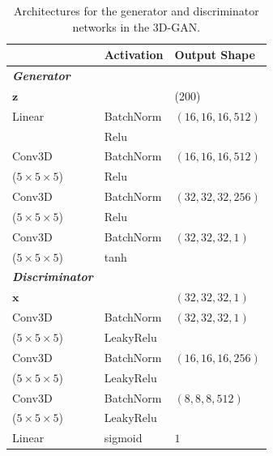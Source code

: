 \documentclass[twocolumn]{article}
\numberwithin{equation}{section}
\begin{document}
\begin{table}[h!]
\centering
\begin{tabularx}{\columnwidth}{@{}YYY@{}}%
 \hline
 & \textbf{Activation} & \textbf{Output Shape}  \\ %
 \hline\hline
 \bf{\textit{Generator}} & & \\
 \hline\hline
$\mathbf{z}$ & &  (200) \\
 \hline
Linear & BatchNorm  & $(16, 16, 16, 512)$ \\ 
     &  Relu &  \\ 
 \hline
 Conv3D & BatchNorm  & $(16, 16, 16, 512)$ \\ 
     ($5\times5\times5$)&   Relu  &                                                  \\
 \hline
Conv3D & BatchNorm  & $(32, 32, 32, 256)$ \\ 
    ($5\times5\times5$)&  Relu &                                                     \\
 \hline
Conv3D  & BatchNorm  & $(32, 32, 32, 1)$ \\ 
 ($5\times5\times5$)& tanh&                                                    \\ [1ex] 
 \hline\hline
 
 \bf{\textit{Discriminator}} & &  \\
 \hline
 $\mathbf{x}$ & &  $(32, 32, 32, 1)$ \\
 \hline
 Conv3D & BatchNorm & $(32, 32, 32, 1)$ \\
  ($5\times5\times5$)&   LeakyRelu&   \\
 \hline
 Conv3D & BatchNorm & $(16, 16, 16, 256)$ \\ 
 ($5\times5\times5$)&  LeakyRelu   \\
 \hline
 Conv3D & BatchNorm &  $(8, 8, 8, 512)$ \\ 
 ($5\times5\times5$)&  LeakyRelu   \\
 \hline
 Linear & sigmoid & $ 1 $ \\ [1ex] 
 \hline
\end{tabularx}
\caption{Architectures for the generator and discriminator networks in the 3D-GAN.}
\label{table:3dgan_archi}
\end{table}
\end{document}
